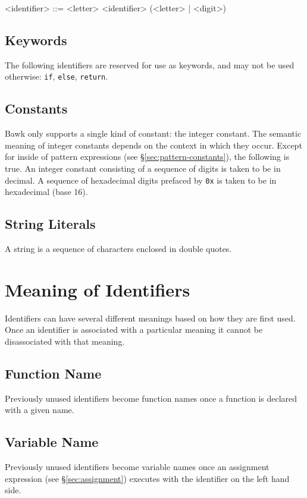 \documentclass[letterpaper]{article}
\begin{document}
\begin{grammar}
<identifier> ::= <letter>
\alt <identifier> (<letter> | <digit>)
\end{grammar}

\subsection{Keywords}
The following identifiers are reserved for use as keywords, and may not be used otherwise: \texttt{if}, \texttt{else}, \texttt{return}.

\subsection{Constants}
\label{sec:constants}
Bawk only supports a single kind of constant: the integer constant.  The semantic meaning of integer constants depends on the context in which they occur.  Except for inside of pattern expressions (see \S\ref{sec:pattern-constants}), the following is true.  An integer constant consisting of a sequence of digits is taken to be in decimal.  A sequence of hexadecimal digits prefaced by \texttt{0x} is taken to be in hexadecimal (base 16).

\subsection{String Literals}
\label{sec:strings}
A string is a sequence of characters enclosed in double quotes.

\section{Meaning of Identifiers}
Identifiers can have several different meanings based on how they are first used.  Once an identifier is associated with a particular meaning it cannot be disassociated with that meaning.

\subsection{Function Name}
Previously unused identifiers become function names once a function is declared with a given name.

\subsection{Variable Name}
\label{sec:variables}
Previously unused identifiers become variable names once an assignment expression (see \S\ref{sec:assignment}) executes with the identifier on the left hand side.
\end{document}
